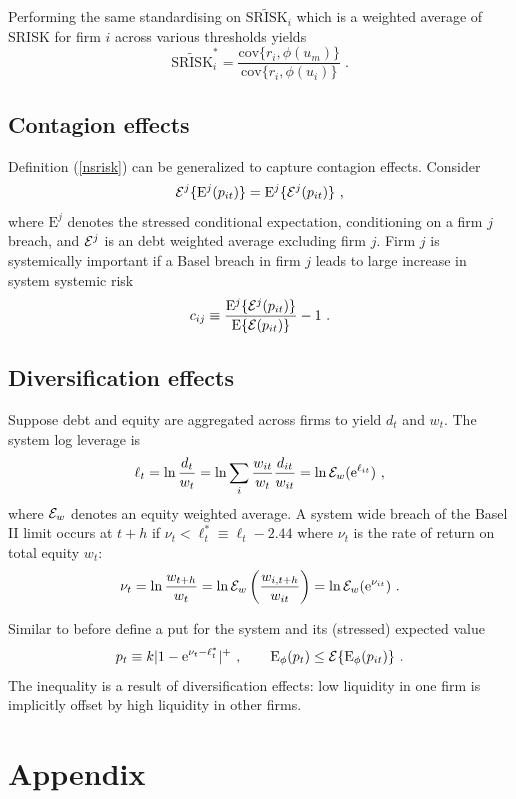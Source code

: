 \documentclass[authoryear]{elsarticle}
\newcommand{\E}{\mathrm{E}}
\newcommand{\e}{\mathrm{e}}
\newcommand{\cov}{\mathrm{cov}}
\newcommand{\Ex}{{\cal E}}
\newcommand{\eref}[1]{(\ref{#1})}
\newcommand{\cq}{\ , \qquad}
\newcommand{\be}[1]{\begin{equation}\label{#1}}
\newcommand{\ee}{\end{equation}}
\begin{document}
Performing the same standardising on $\widetilde{\mathrm{SRISK}}_i$ which is a weighted average of SRISK for firm $i$ across various thresholds yields
$$
\widetilde{\mathrm{SRISK}}_i^* = \frac{\cov\{r_i,\phi(u_m)\}}{\cov\{r_i,\phi(u_i)\}}   \;.
$$




\subsection{Contagion effects}
Definition \eref{nsrisk} can be generalized to capture contagion effects.  Consider 
\be{cont}
\Ex^j\{\E^j(p_{it})\}=\E^j\{\Ex^j(p_{it})\}\ ,
\ee
where  $\E^j$ denotes the stressed conditional expectation, conditioning on a firm $j$ breach, and $\Ex^j$ is an debt weighted average excluding firm $j$.  Firm $j$ is systemically important  if a Basel breach in firm $j$ leads to large increase in system systemic risk
$$
c_{ij}\equiv \frac{\E^j\{\Ex^j(p_{it})\}}{\E\{\Ex(p_{it})\}}-1\ .
$$

\subsection{Diversification effects} 

Suppose debt and equity are  aggregated across firms to yield $d_t$ and $w_t$.  The system log leverage is  
$$
\ell_t =  \ln \frac{d_t}{w_t} =  \ln \sum_i\frac{w_{it}}{w_t}\frac{ d_{it}}{ w_{it}} = \ln \Ex_w(\e^{\ell_{it}}) \ ,
$$
where $\Ex_w$ denotes an equity weighted average.  A system wide breach of the Basel II limit occurs at $t+h$ if
$
\nu_t < \ell_t^*\equiv \ell_t - 2.44
$
where $\nu_t$ is the rate of return on total equity $w_t$:
\be{ew}
 \nu_t = \ln \frac{w_{t+h}}{w_t} = \ln \Ex_w\left(\frac{w_{i,t+h}}{w_{it}}\right) = \ln \Ex_w(\e^{\nu_{it}})\ . 
\ee

Similar to before define a put for the system and its (stressed) expected value
$$
p_t\equiv k|1-\e^{\nu_t-\ell_t^*}|^+\cq \Es(p_t)\le\Ex\{\Es(p_{it})\}\ .
$$
The inequality is a result  of diversification effects:   low liquidity  in one firm is implicitly offset by high liquidity  in other  firms.


\section*{Appendix}
\end{document}
